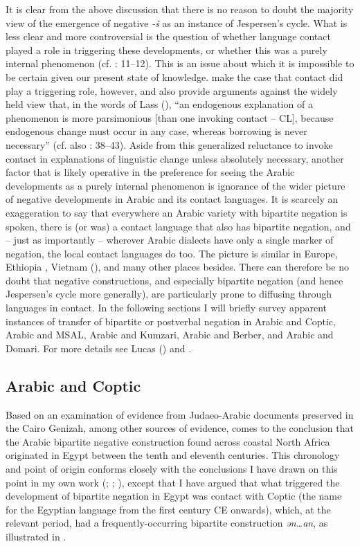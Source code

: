 \documentclass[output=paper]{langsci/langscibook}
\begin{document}
It is clear from the above discussion that there is no reason to doubt the majority view of the emergence of negative \textit{{}-š} as an instance of Jespersen’s cycle. What is less clear and more controversial is the question of whether language contact played a role in triggering these developments, or whether this was a purely internal phenomenon (cf. \citealt{Diem2014}: 11–12). This is an issue about which it is impossible to be certain given our present state of knowledge. \citet{LucasLash2010} make the case that contact did play a triggering role, however, and also provide arguments against the widely held view that, in the words of Lass (\citeyear[209]{Lass1997}), “an endogenous explanation of a phenomenon is more parsimonious [than one invoking contact – CL], because endogenous change must occur in any case, whereas borrowing is never necessary” (cf. also \citealt{Lucas2009}: 38–43). Aside from this generalized reluctance to invoke contact in explanations of linguistic change unless absolutely necessary, another factor that is likely operative in the preference for seeing the Arabic developments as a purely internal phenomenon is ignorance of the wider picture of negative developments in Arabic and its contact languages. It is scarcely an exaggeration to say that everywhere an Arabic variety with bipartite negation is spoken, there is (or was) a contact language that also has bipartite negation, and – just as importantly – wherever Arabic dialects have only a single marker of negation, the local contact languages do too. The picture is similar in Europe, Ethiopia \citep{Lucas2009}, Vietnam (\citealt{AuweraVossen2015}), and many other places besides. There can therefore be no doubt that negative constructions, and especially bipartite negation (and hence Jespersen’s cycle more generally), are particularly prone to diffusing through languages in contact. In the following sections I will briefly survey apparent instances of transfer of bipartite or postverbal negation in Arabic and Coptic, Arabic and MSAL, Arabic and Kumzari, Arabic and Berber, and Arabic and Domari. For more details see Lucas (\citeyear{Lucas2007,Lucas2009,Lucas2013}) and \citet{LucasLash2010}.



\subsection{Arabic and Coptic}


Based on an examination of evidence from Judaeo-Arabic documents preserved in the Cairo Genizah, among other sources of evidence, \citet{Diem2014} comes to the conclusion that the Arabic bipartite negative construction found across coastal North Africa originated in Egypt between the tenth and eleventh centuries. This chronology and point of origin conforms closely with the conclusions I have drawn on this point in my own work (\citealt{Lucas2007}; \citeyear{Lucas2009}; \citealt{LucasLash2010}), except that I have argued that what triggered the development of bipartite negation in Egypt was contact with Coptic (the name for the Egyptian language from the first century CE onwards), which, at the relevant period, had a frequently-occurring bipartite construction \textit{ən…an}, as illustrated in .
\end{document}
